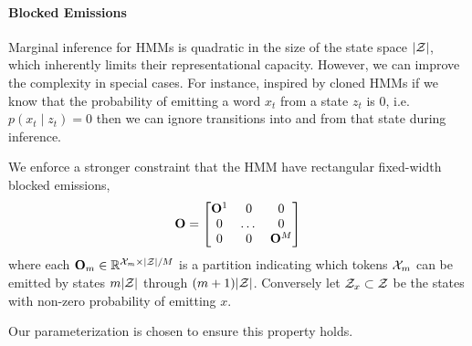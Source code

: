 \documentclass[11pt,a4paper]{article}
\begin{document}

\paragraph{Blocked Emissions}
Marginal inference for HMMs is quadratic in the size of the state space $|\mathcal{Z}|$, which inherently limits their representational capacity.
However, we can improve the complexity in special cases.
For instance, inspired by cloned HMMs \citep{dedieu2019learning} if we know that the probability of emitting a word $x_t$ from a state $z_t$ is 0,
i.e. $p(x_t \mid z_t) = 0$  then we can ignore transitions into and from that state during inference. 

We enforce a stronger constraint that the HMM have rectangular fixed-width blocked emissions,
\[\mathbf{O} = \begin{bmatrix} \mathbf{O}^1 & 0 & 0 \\ 0 & $\dots$ & 0 \\ 0 & 0 & \mathbf{O}^M \\
\end{bmatrix}\]
where each $\mathbf{O}_m \in \mathbb{R}^{ {\cal X}_m \times |{\cal Z}|/M}$ is a partition indicating which tokens ${\cal X}_m$ can be emitted by states $m|{\cal Z}|$ through $(m+1)|{\cal Z}|$. Conversely let $\mathcal{Z}_x \subset {\cal Z}$ be the states with non-zero probability of emitting $x$.

Our parameterization is chosen to ensure this property holds.

\pgfkeys{tikz/mymatrix/.style={matrix of math nodes,nodes in empty cells,
column sep=7pt,row sep=7pt,
nodes={minimum width=10pt,minimum height=10pt,
anchor=center,inner sep=0pt,outer sep=0pt,scale=\myscale,transform shape}}}
\end{document}
